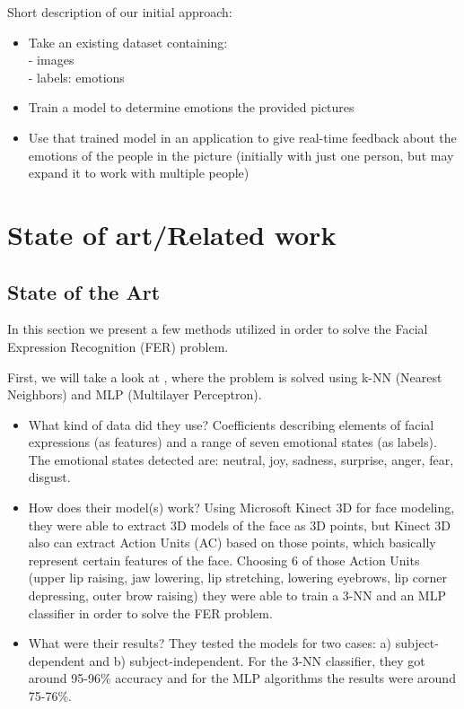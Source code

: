 \documentclass[runningheads,a4paper,11pt]{report}
\begin{document}
\pagebreak
Short description of our initial approach:
\begin{itemize}
	\item Take an existing dataset containing:\\
	- images\\
	- labels: emotions
	\item Train a model to determine emotions the provided pictures
	\item Use that trained model in an application to give real-time feedback about the emotions of the people in the picture (initially with just one person, but may expand it to work with multiple people)
\end{itemize}


\chapter{State of art/Related work}
\label{chapter:stateOfArt}


\section{State of the Art}
\label{section:soa}

In this section we present a few methods utilized in order to solve the Facial Expression Recognition (FER) problem.

First, we will take a look at \cite{Tarnowski17}, where the problem is solved using k-NN (Nearest Neighbors) and MLP (Multilayer Perceptron).
\begin{itemize}
	\item What kind of data did they use? Coefficients describing elements of facial expressions (as features) and a range of seven emotional states (as labels). The emotional states detected are: neutral, joy, sadness, surprise, anger, fear, disgust.
	\item How does their model(s) work? Using Microsoft Kinect 3D for face modeling, they were able to extract 3D models of the face as 3D points, but Kinect 3D also can extract Action Units (AC) based on those points, which basically represent certain features of the face. Choosing 6 of those Action Units (upper lip raising, jaw lowering, lip stretching, lowering eyebrows, lip corner depressing, outer brow raising) they were able to train a 3-NN and an MLP classifier in order to solve the FER problem.
	\item What were their results? They tested the models for two cases: a) subject-dependent and b) subject-independent. For the 3-NN classifier, they got around 95-96\% accuracy and for the MLP algorithms the results were around 75-76\%.
\end{itemize}
\end{document}
